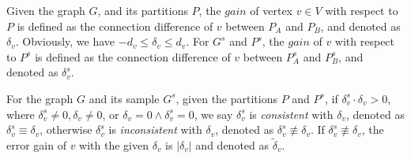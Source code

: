 \documentclass{sig-alternate-2013}
\begin{document}
\begin{definition}\label{def-gain}
 Given the graph $G$, and its partitions $P$, the $gain$ of vertex $v \in V$ with respect to $P$ is defined as the connection difference of $v$ between $P_A$ and $P_B$, and denoted as $\delta_v$.
 Obviously, we have $-d_v\leq\delta_v\leq d_v$. For $G^s$ and $P^s$, the $gain$ of $v$ with respect to $P^s$ is defined as the connection difference of $v$ between $P_A^s$ and $P_B^s$, and  denoted as $\delta_v^s$.
\end{definition}

\begin{definition}\label{def-inconsistgain}
For the graph $G$ and its sample $G^s$, given the partitions $P$ and $P^s$, if  $\delta_v^s \cdot \delta_v >0$, where $\delta_v^s \neq 0,  \delta_v \neq 0$, or $\delta_v=0 \land \delta_v^s =0$, we say $\delta_v^s$ is \textit{consistent} with $\delta_v$, denoted as  $\delta_v^s \equiv \delta_v $,  otherwise  $\delta_v^s$ is \textit{inconsistent} with $\delta_v$, denoted as $\delta_v^s \not\equiv \delta_v $. If $\delta_v^s \not\equiv \delta_v $, the error gain of $v$ with the given $\delta_v$ is $ |\delta_v| $ and denoted as $\tilde\delta_v$.
\end{definition}
\end{document}
